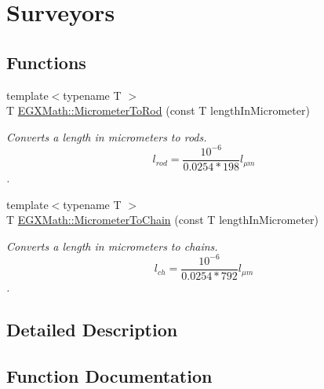\hypertarget{group___e_g_x_math-_conversions-_length_conversions-_micrometer-_surveyors}{}\section{Surveyors}
\label{group___e_g_x_math-_conversions-_length_conversions-_micrometer-_surveyors}
\subsection*{Functions}
\begin{DoxyCompactItemize}
\item 
{\footnotesize template$<$typename T $>$ }\\T \mbox{\hyperlink{group___e_g_x_math-_conversions-_length_conversions-_micrometer-_surveyors_ga86e147ebc58116be9c15a873451ac156}{E\+G\+X\+Math\+::\+Micrometer\+To\+Rod}} (const T length\+In\+Micrometer)
\begin{DoxyCompactList}\small\item\em Converts a length in micrometers to rods. \[ l_{rod}= \frac{10^{-6}}{0.0254 * 198} l_{\mu m} \]. \end{DoxyCompactList}\item 
{\footnotesize template$<$typename T $>$ }\\T \mbox{\hyperlink{group___e_g_x_math-_conversions-_length_conversions-_micrometer-_surveyors_ga0462dc1021b3979ea0d83113aedbbc4c}{E\+G\+X\+Math\+::\+Micrometer\+To\+Chain}} (const T length\+In\+Micrometer)
\begin{DoxyCompactList}\small\item\em Converts a length in micrometers to chains. \[ l_{ch}= \frac{10^{-6}}{0.0254 * 792} l_{\mu m} \]. \end{DoxyCompactList}\end{DoxyCompactItemize}


\subsection{Detailed Description}


\subsection{Function Documentation}
\mbox{\label{group___e_g_x_math-_conversions-_length_conversions-_micrometer-_surveyors_ga0462dc1021b3979ea0d83113aedbbc4c}} 
